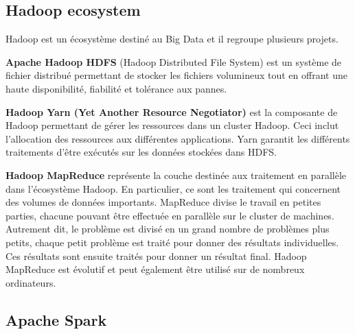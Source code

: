 \subsection{Hadoop ecosystem}

Hadoop est un écosystème destiné au Big Data et il regroupe plusieurs projets. \par 
\textbf{Apache Hadoop HDFS}  (Hadoop Distributed File System) est un système de fichier distribué permettant de stocker les fichiers volumineux tout en  offrant une haute disponibilité, fiabilité et tolérance aux pannes.\par
\textbf{Hadoop Yarn (Yet Another Resource Negotiator)} est la composante  de Hadoop permettant de  gérer les ressources dans un cluster Hadoop. Ceci inclut l'allocation des ressources aux différentes applications.  Yarn  garantit les différents traitements d'être exécutés sur les données stockées dans HDFS.\par

\textbf{Hadoop MapReduce}  représente la couche destinée aux traitement en parallèle  dans l'écosystème Hadoop. En particulier, ce sont les traitement qui concernent des volumes de données importants.
MapReduce divise le travail en petites parties, chacune pouvant être effectuée en parallèle sur le cluster de machines. Autrement dit, le  problème est divisé en un grand nombre de problèmes plus petits, chaque petit problème est traité pour donner des résultats individuelles. Ces résultats sont ensuite traités pour donner un résultat final. Hadoop MapReduce est évolutif et peut également être utilisé sur de nombreux ordinateurs. 










\subsection{Apache Spark } \label{apache-spark}

